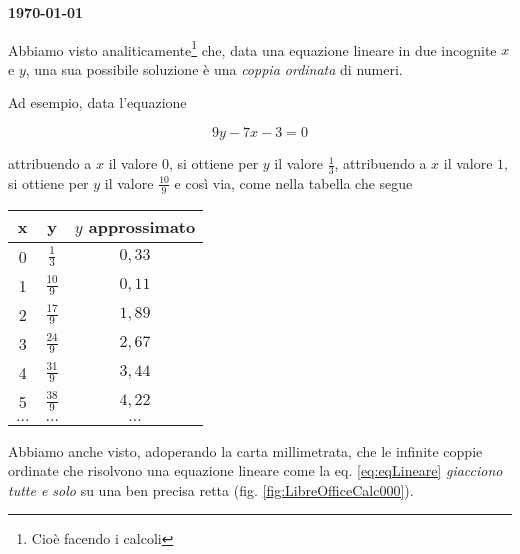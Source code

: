 \documentclass[17pt]{extarticle}
\begin{document}


\begin{flushright}
{\bf \today}
\end{flushright}

\tableofcontents

\clearpage


Abbiamo visto analiticamente\footnote{Cioè facendo i calcoli} che, data una equazione lineare in due incognite $x$ e $y$, una sua possibile soluzione è una \emph{coppia ordinata} di numeri. 


Ad esempio, data l'equazione 

\begin{equation}\label{eq:eqLineare}
	9y - 7x - 3 = 0
\end{equation}

attribuendo a $x$ il valore $0$, si ottiene per $y$ il valore $\frac{1}{3}$, attribuendo a $x$ il valore $1$, si ottiene per $y$ il valore $\frac{10}{9}$ e così via, come nella tabella che segue


\begin{center}
\begin{tabular}%
	{ |c|c| c| }
 \hline
 {\bf x} &  {\bf y} &  $y$ approssimato \\ 
 \hline
 0 & $\frac{1}{3}$  &  $0,33$ \\
 1 & $\frac{10}{9}$ &  $0,11$ \\ 
 2 & $\frac{17}{9}$ &  $1,89$ \\ 
 3 & $\frac{24}{9}$ &  $2,67$ \\ 
 4 & $\frac{31}{9}$ &  $3,44$ \\ 
 5 & $\frac{38}{9}$ &  $4,22$ \\ 
$\dots$ & $\dots$	& $\dots$\\	
 \hline

\end{tabular}
\end{center}



Abbiamo anche visto, adoperando la carta millimetrata, che le infinite coppie ordinate che risolvono una equazione lineare come la eq. \ref{eq:eqLineare} \emph{giacciono tutte e solo} su una ben precisa retta (fig. \ref{fig:LibreOfficeCalc000}). %
\end{document}
